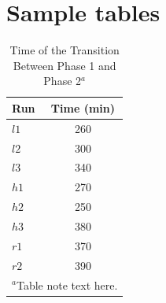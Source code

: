 \documentclass[NETN]{stjour}
\begin{document}
\newpage
\section{Sample tables}

\begin{table}[!ht]
\caption{Time of the Transition Between Phase 1 and Phase 2$^{a}$}
\label{tab:label}
\centering
\begin{tabular}{lc}
\hline
 Run  & Time (min)  \\
\hline
  $l1$  & 260   \\
  $l2$  & 300   \\
  $l3$  & 340   \\
  $h1$  & 270   \\
  $h2$  & 250   \\
  $h3$  & 380   \\
  $r1$  & 370   \\
  $r2$  & 390   \\
\hline
\multicolumn{2}{l}{$^{a}$Table note text here.}
\end{tabular}
\end{table}
\end{document}
